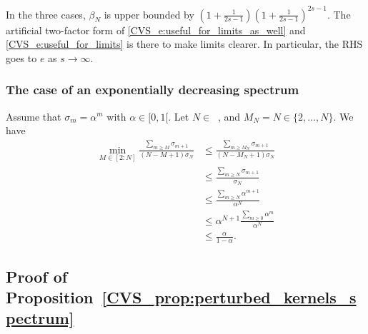 \documentclass[twoside,11pt]{book}
\numberwithin{theorem}{chapter}
\numberwithin{definition}{chapter}
\numberwithin{proposition}{chapter}
\numberwithin{corollary}{chapter}
\numberwithin{example}{chapter}
\numberwithin{lemma}{chapter}
\numberwithin{assumption}{chapter}
\DeclareMathOperator{\Ns}{\mathbb{N}^{*}}
\begin{document}

In the three cases, $\beta_{N}$ is upper bounded by $\left(1+\frac{1}{2s-1}\right) \left(1+\frac{1}{2s-1}\right)^{2s-1}$. The artificial two-factor form of \eqref{CVS_e:useful_for_limits_as_well} and \eqref{CVS_e:useful_for_limits} is there to make limits clearer. In particular, the RHS goes to $e$ as $s\rightarrow \infty$.

\subsubsection{The case of an exponentially decreasing spectrum}
Assume that $\sigma_{m} = \alpha^{m}$ with $\alpha \in [0,1[$.
Let $N \in \Ns$, and $M_N = N \in \{ 2,\dots, N\}$.
We have
\begin{align}
\min_{M \in [2:N]}\frac{\sum_{m \geq M} \sigma_{m+1}}{(N-M+1)\sigma_N}
& \leq \frac{\sum_{m \geq M_N} \sigma_{m+1}}{(N-M_N+1)\sigma_N}\\
& \leq \frac{\sum_{m \geq N} \sigma_{m+1}}{\sigma_N}\\
& \leq \frac{\sum_{m \geq N} \alpha^{m+1}}{\alpha^{N}}\\
& \leq \alpha^{N+1}\frac{\sum_{m \geq 0} \alpha^{m}}{\alpha^{N}}\\
& \leq \frac{\alpha}{1-\alpha}.
\end{align}

\subsection{Proof of Proposition~\ref{CVS_prop:perturbed_kernels_spectrum}}\label{CVS_app:proof_perturbed_kernels_spectrum}
\end{document}
